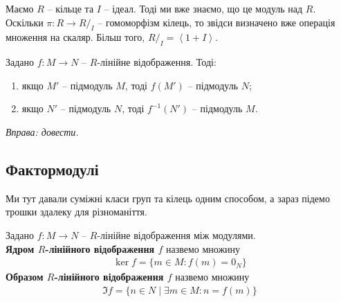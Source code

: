 \documentclass{math_library}
\begin{document}
\begin{example}
Маємо $R$ -- кільце та $I$ -- ідеал. Тоді ми вже знаємо, що це модуль над $R$. Оскільки $\pi \colon R \to R/_I$ -- гомоморфізм кілець, то звідси визначено вже операція множення на скаляр. Більш того, $R/_I = \left< 1 + I\right>$.
\end{example}

\begin{proposition}
Задано $f \colon M \to N$ -- $R$-лінійне відображення. Тоді:
\begin{enumerate}[nosep, wide=0pt, label={\arabic*)}]
\item якщо $M'$ -- підмодуль $M$, тоді $f(M')$ -- підмодуль $N$;
\item якщо $N'$ -- підмодуль $N$, тоді $f^{-1}(N')$ -- підмодуль $M$.
\end{enumerate}
\textit{Вправа: довести.}
\end{proposition}

\subsection{Фактормодулі}
Ми тут давали суміжні класи груп та кілець одним способом, а зараз підемо трошки здалеку для різноманіття.

\begin{definition}
Задано $f \colon M \to N$ -- $R$-лінійне відображення між модулями.\\
\textbf{Ядром $R$-лінійного відображення $f$} назвемо множину
\begin{align*}
\ker f = \{ m \in M: f(m) = 0_N \}
\end{align*}
\textbf{Образом $R$-лінійного відображення $f$} назвемо множину
\begin{align*}
\Im f = \{ n \in N \mid \exists m \in M: n = f(m) \}
\end{align*}
\end{definition}
\end{document}
